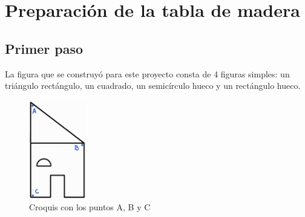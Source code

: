 \documentclass[12pt, titlepage]{report}
\begin{document}
    \section{Preparación de la tabla de madera}   
    \subsection*{Primer paso}
    La figura que se construyó para este proyecto consta de 4 figuras simples: un triángulo rectángulo, un cuadrado, un semicírculo hueco y un rectángulo hueco.

    \begin{figure}[ht]
        \centering
        \setcounter{figure}{0}
        \includegraphics[width=2.5cm]{Croquis.jpg}
        \caption{Croquis con los puntos A, B y C}
    \end{figure}
    
\end{document}
